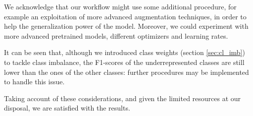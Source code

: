 \documentclass[conference,compsoc,11pt]{IEEEtran}
\begin{document}
We acknowledge that our workflow might use some additional procedure, for example an exploitation of more advanced augmentation techniques, in order to help the generalization power of the model. Moreover, we could experiment with more advanced pretrained models, different optimizers and learning rates.

It can be seen that, although we introduced class weights (section \ref{sec:cl_imb}) to tackle class imbalance, the F1-scores of the underrepresented classes are still lower than the ones of the other classes: further procedures may be implemented to handle this issue.

Taking account of these considerations, and given the limited resources at our disposal, we are satisfied with the results.
\end{document}
